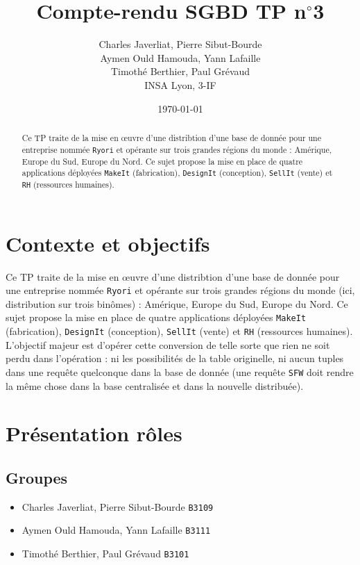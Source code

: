 \documentclass[10pt,a4paper]{article}
\title{Compte-rendu SGBD TP n$^\circ$3}
\author{
Charles Javerliat, Pierre Sibut-Bourde\\
Aymen Ould Hamouda, Yann Lafaille\\
Timothé Berthier, Paul Grévaud\\
\small INSA Lyon, 3-IF
}
\date{\today}
\theoremstyle{plain}
\begin{document}
\maketitle
\begin{abstract}
    Ce TP traite de la mise en \oe uvre d'une distribtion d'une base de donnée pour une entreprise nommée \verb|Ryori| et opérante sur trois grandes régions du monde : Amérique, Europe du Sud, Europe du Nord. Ce sujet propose la mise en place de quatre applications déployées \verb|MakeIt| (fabrication), \verb|DesignIt| (conception), \verb|SellIt| (vente) et \verb|RH| (ressources humaines).
\end{abstract}

\tableofcontents
\newpage

\section{Contexte et objectifs}
Ce TP traite de la mise en \oe uvre d'une distribtion d'une base de donnée pour une entreprise nommée \verb|Ryori| et opérante sur trois grandes régions du monde (ici, distribution sur trois binômes) : Amérique, Europe du Sud, Europe du Nord. Ce sujet propose la mise en place de quatre applications déployées \verb|MakeIt| (fabrication), \verb|DesignIt| (conception), \verb|SellIt| (vente) et \verb|RH| (ressources humaines). L'objectif majeur est d'opérer cette conversion de telle sorte que rien ne soit perdu dans l'opération : ni les possibilités de la table originelle, ni aucun tuples dans une requête quelconque dans la base de donnée (une requête \verb|SFW| doit rendre la même chose dans la base centralisée et dans la nouvelle distribuée).

\section{Présentation rôles}
\subsection{Groupes}
\begin{itemize}
    \item Charles Javerliat, Pierre Sibut-Bourde \verb|B3109|
    \item Aymen Ould Hamouda, Yann Lafaille \verb|B3111|
    \item Timothé Berthier, Paul Grévaud \verb|B3101|
\end{itemize}
\end{document}
